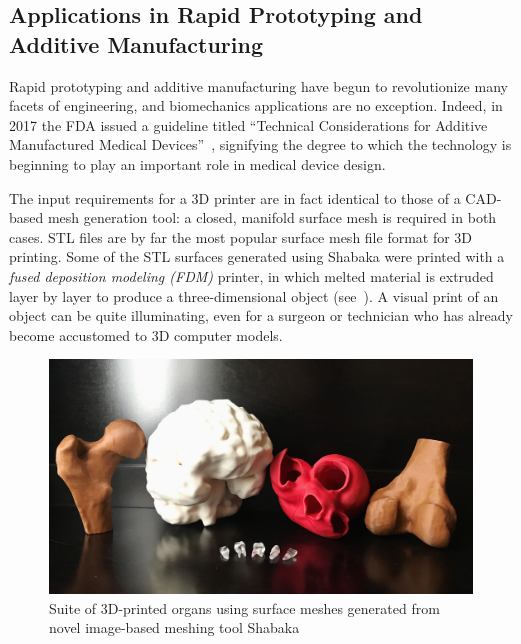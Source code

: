 \subsection[Applications in Rapid Prototyping and Additive Manufacturing]{\texorpdfstring{Applications in Rapid Prototyping and Additive \newline Manufacturing}{Applications in Rapid Prototyping and Additive \newline Manufacturing}}
\label{Applications in Rapid Prototyping and Additive Manufacturing}

Rapid prototyping and additive manufacturing have begun to revolutionize many facets of engineering, and biomechanics applications are no exception. Indeed, in 2017 the FDA issued a guideline titled ``Technical Considerations for Additive Manufactured Medical Devices''~\cite{fda3_2016}, signifying the degree to which the technology is beginning to play an important role in medical device design.

The input requirements for a 3D printer are in fact identical to those of a CAD-based mesh generation tool: a closed, manifold surface mesh is required in both cases. STL files are by far the most popular surface mesh file format for 3D printing. Some of the STL surfaces generated using Shabaka were printed with a \textit{fused deposition modeling (FDM)} printer, in which melted material is extruded layer by layer to produce a three-dimensional object (see~). A visual print of an object can be quite illuminating, even for a surgeon or technician who has already become accustomed to 3D computer models.

\begin{figure}
\centering
		\includegraphics[width=1.0\textwidth]{media/6-3dprint/3dprint.jpg}
%
\caption{Suite of 3D-printed organs using surface meshes generated from novel image-based meshing tool Shabaka}
\label{fig:3dprint}
\end{figure}

